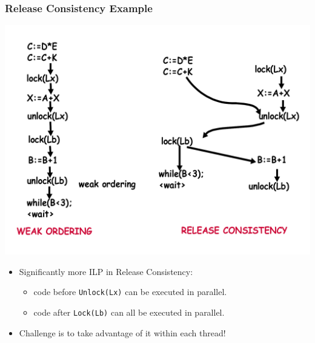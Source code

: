 \documentclass{beamer}
\begin{document}
\begin{frame}[fragile,t]
\frametitle{Release Consistency Example}
\vspace{-3ex}
\includegraphics[width=55ex]{Ch7Figs/ReleasedConsistGraph}
\vspace{-4ex}

\begin{itemize}
    \item Significantly more ILP in Release Consistency:
        \begin{itemize}
            \item code before {\tt Unlock(Lx)} can be executed in parallel.
            \item code after {\tt Lock(Lb)} can all be executed in parallel. 
        \end  {itemize}\medskip

    \item Challenge is to take advantage of it within each thread!
\end{itemize}
\end{frame}
\end{document}
